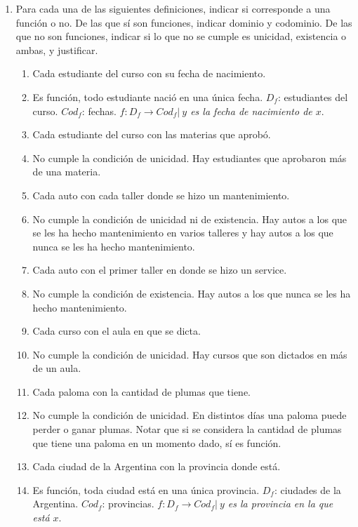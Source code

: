 \documentclass[a4paper]{article}
\newcommand{\answer}{\item[**]}
\newcommand{\exercise}{\item}
\begin{document}
\begin{enumerate}
\begin{enumerate} [label=(\alph*)]
	\end{enumerate}

	\exercise Para cada una de las siguientes definiciones, indicar si corresponde a una función o no. De las que sí son funciones, indicar dominio y codominio. De las que no son funciones, indicar si lo que no se cumple es unicidad, existencia o ambas, y justificar.
	\begin{enumerate} [label=(\alph*)]
		\item Cada estudiante del curso con su fecha de nacimiento.
		\answer Es función, todo estudiante nació en una única fecha. $D_f$: estudiantes del curso. $Cod_f$: fechas. $f:D_f \to Cod_f|~$\textit{$y$ es la fecha de nacimiento de $x$}.

		\item Cada estudiante del curso con las materias que aprobó.
		\answer No cumple la condición de unicidad. Hay estudiantes que aprobaron más de una materia.

		\item Cada auto con cada taller donde se hizo un mantenimiento.
		\answer No cumple la condición de unicidad ni de existencia. Hay autos a los que se les ha hecho mantenimiento en varios talleres y hay autos a los que nunca se les ha hecho mantenimiento.

		\item Cada auto con el primer taller en donde se hizo un service.
		\answer No cumple la condición de existencia. Hay autos a los que nunca se les ha hecho mantenimiento.

		\item Cada curso con el aula en que se dicta.
		\answer No cumple la condición de unicidad. Hay cursos que son dictados en más de un aula.

		\item Cada paloma con la cantidad de plumas que tiene.
		\answer No cumple la condición de unicidad. En distintos días una paloma puede perder o ganar plumas. Notar que si se considera la cantidad de plumas que tiene una paloma en un momento dado, sí es función.

		\item Cada ciudad de la Argentina con la provincia donde está.
		\answer Es función, toda ciudad está en una única provincia. $D_f$: ciudades de la Argentina. $Cod_f$: provincias. $f:D_f \to Cod_f|~$\textit{$y$ es la provincia en la que está $x$}.


\end{enumerate}
\end{enumerate}
\end{document}
